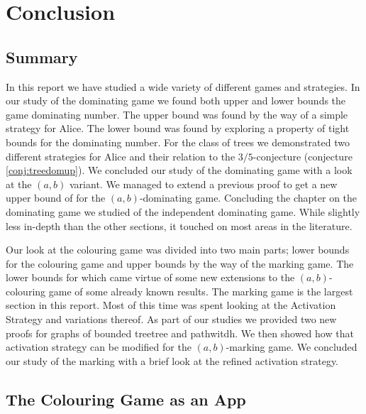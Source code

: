 \chapter{Conclusion}\label{chpt:con}




\section{Summary}

In this report we have studied a wide variety of different games and strategies. In our study of the dominating game we found both upper and lower bounds the game dominating number. The upper bound was found by the way of a simple strategy for Alice. The lower bound was found by exploring a property of tight bounds for the dominating number. For the class of trees we demonstrated two different strategies for Alice and their relation to the $3/5$-conjecture (conjecture \ref{conj:treedomup}). We concluded our study of the dominating game with a look at the $(a,b)$ variant. We managed to extend a previous proof to get a new upper bound of for the $(a,b)$-dominating game. 
Concluding the chapter on the dominating game we studied of the independent dominating game. While slightly less in-depth than the other sections, it touched on most areas in the literature.

Our look at the colouring game was divided into two main parts; lower bounds for the colouring game and upper bounds by the way of the marking game. The lower bounds for which came virtue of some new extensions to the $(a,b)$-colouring game of some already known results.
The marking game is the largest section in this report. Most of this time was spent looking at the Activation Strategy and variations thereof. As part of our studies we provided two new proofs for graphs of bounded treetree and pathwitdh. We then showed how that activation strategy can be modified for the $(a,b)$-marking game. We concluded our study of the marking with a brief look at the refined activation strategy.

\section{The Colouring Game as an App}

